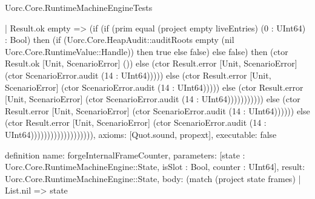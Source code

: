 \begin{lexlean}{Uorc.Core.RuntimeMachineEngineTests}
\begin{semanticmodule}
{                                  | Result.ok empty => (if (if (prim equal (project empty liveEntries) (0 : UInt64) : Bool) then (if (Uorc.Core.HeapAudit::auditRoots empty (nil Uorc.Core.RuntimeValue::Handle)) then true else false) else false) then (ctor Result.ok [Unit, ScenarioError] ()) else (ctor Result.error [Unit, ScenarioError] (ctor ScenarioError.audit (14 : UInt64))))) else (ctor Result.error [Unit, ScenarioError] (ctor ScenarioError.audit (14 : UInt64))))) else (ctor Result.error [Unit, ScenarioError] (ctor ScenarioError.audit (14 : UInt64))))))))))) else (ctor Result.error [Unit, ScenarioError] (ctor ScenarioError.audit (14 : UInt64)))))) else (ctor Result.error [Unit, ScenarioError] (ctor ScenarioError.audit (14 : UInt64))))))))))))))))))),
  axioms: [Quot.sound, propext],
  executable: false
}

definition{
  name: forgeInternalFrameCounter,
  parameters: [state : Uorc.Core.RuntimeMachineEngine::State, isSlot : Bool, counter : UInt64],
  result: Uorc.Core.RuntimeMachineEngine::State,
  body: (match (project state frames)
    | List.nil => state
}
\end{semanticmodule}
\end{lexlean}
